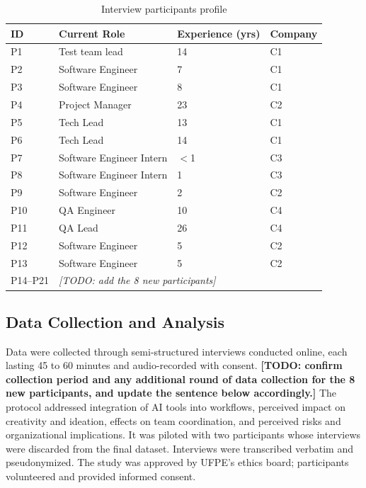 \documentclass[10pt,journal,compsoc]{IEEEtran}
\begin{document}
\begin{table}[t]
\centering
\caption{Interview participants profile}
\label{tab:participants}
\begin{tabular}{@{}llll@{}}
\toprule
ID & Current Role & Experience (yrs) & Company \\
\midrule
P1  & Test team lead           & 14  & C1 \\
P2  & Software Engineer        & 7   & C1 \\
P3  & Software Engineer        & 8   & C1 \\
P4  & Project Manager          & 23  & C2 \\
P5  & Tech Lead                & 13  & C1 \\
P6  & Tech Lead                & 14  & C1 \\
P7  & Software Engineer Intern & $<$1 & C3 \\
P8  & Software Engineer Intern & 1   & C3 \\
P9  & Software Engineer        & 2   & C2 \\
P10 & QA Engineer               & 10  & C4 \\
P11 & QA Lead                   & 26  & C4 \\
P12 & Software Engineer        & 5   & C2 \\
P13 & Software Engineer        & 5   & C2 \\
P14--P21 & \multicolumn{3}{l}{\textit{[TODO: add the 8 new participants]}} \\
\bottomrule
\end{tabular}
\end{table}

\subsection{Data Collection and Analysis}

Data were collected through semi-structured interviews conducted online, each lasting 45 to 60 minutes and audio-recorded with consent. \textbf{[TODO: confirm collection period and any additional round of data collection for the 8 new participants, and update the sentence below accordingly.]} The protocol addressed integration of AI tools into workflows, perceived impact on creativity and ideation, effects on team coordination, and perceived risks and organizational implications. It was piloted with two participants whose interviews were discarded from the final dataset. Interviews were transcribed verbatim and pseudonymized. The study was approved by UFPE's ethics board; participants volunteered and provided informed consent.
\end{document}
